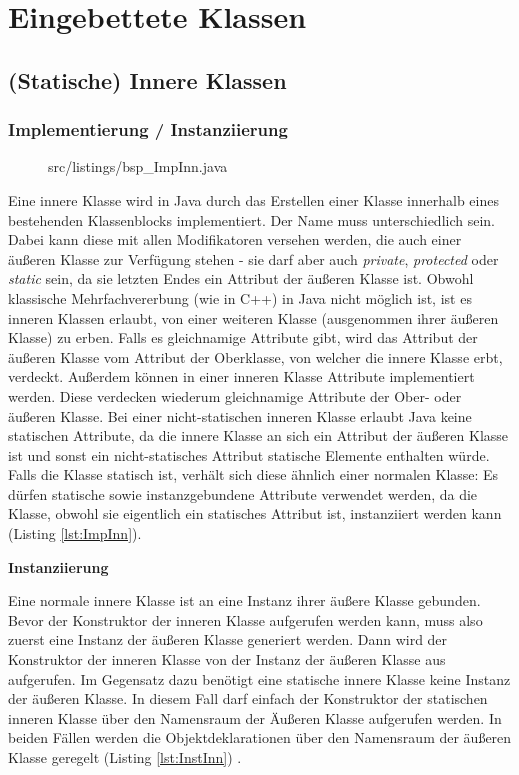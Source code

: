 \chapter{Eingebettete Klassen}
\section{(Statische) Innere Klassen}
\subsection {Implementierung / Instanziierung}

\begin{figure}[hbt]
\lstset{language=Java}
 {src/listings/bsp_ImpInn.java}
\end{figure}

Eine innere Klasse wird in Java durch das Erstellen einer Klasse innerhalb eines bestehenden Klassenblocks implementiert.
Der Name muss unterschiedlich sein. Dabei kann diese mit allen Modifikatoren versehen werden, die auch einer äußeren Klasse zur Verfügung stehen - sie darf aber auch {\it private}, {\it protected} oder {\it static} sein, da sie letzten Endes ein Attribut der äußeren Klasse ist.
Obwohl klassische Mehrfachvererbung (wie in C++) in Java nicht möglich ist, ist es inneren Klassen erlaubt, von einer weiteren Klasse (ausgenommen ihrer äußeren Klasse) zu erben.
Falls es gleichnamige Attribute gibt, wird das Attribut der äußeren Klasse vom Attribut der Oberklasse, von welcher die innere Klasse erbt, verdeckt.
Außerdem können in einer inneren Klasse Attribute implementiert werden. Diese verdecken wiederum gleichnamige Attribute der Ober- oder äußeren Klasse.
Bei einer nicht-statischen inneren Klasse erlaubt Java keine statischen Attribute, da die innere Klasse an sich ein Attribut der äußeren Klasse ist und sonst ein nicht-statisches Attribut statische Elemente enthalten würde.
Falls die Klasse statisch ist, verhält sich diese ähnlich einer normalen Klasse: Es dürfen statische sowie instanzgebundene Attribute verwendet werden, da die Klasse, obwohl sie eigentlich ein statisches Attribut ist, instanziiert werden kann (Listing \ref{lst:ImpInn}).


{\bf Instanziierung}

Eine normale innere Klasse ist an eine Instanz ihrer äußere Klasse gebunden. Bevor der Konstruktor der inneren Klasse aufgerufen werden kann, muss also zuerst eine Instanz der äußeren Klasse generiert werden.
Dann wird der Konstruktor der inneren Klasse von der Instanz der äußeren Klasse aus aufgerufen.
Im Gegensatz dazu benötigt eine statische innere Klasse keine Instanz der äußeren Klasse.
In diesem Fall darf einfach der Konstruktor der statischen inneren Klasse über den Namensraum der Äußeren Klasse aufgerufen werden.
In beiden Fällen werden die Objektdeklarationen über den Namensraum der äußeren Klasse geregelt (Listing \ref{lst:InstInn}) \cite{goll2013java}.

